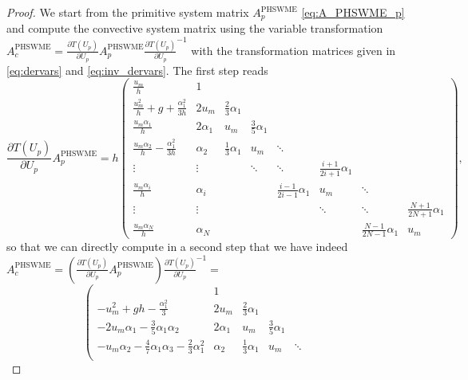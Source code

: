 \documentclass[a4paper, 11pt]{article}
\begin{document}
\begin{proof}
    We start from the primitive system matrix $A^{\textrm{PHSWME}}_{p}$ \eqref{eq:A_PHSWME_p} and compute the convective system matrix using the variable transformation $A^{\textrm{PHSWME}}_{c} = \frac{\partial  T\left(U_{p}\right)}{\partial U_{p}} A^{\textrm{PHSWME}}_{p} \frac{\partial T\left(U_{p}\right)}{\partial U_{p}}^{-1}$ with the transformation matrices given in \eqref{eq:dervars} and \eqref{eq:inv_dervars}. The first step reads
    \begin{equation}
        \frac{\partial  T\left(U_{p}\right)}{\partial U_{p}} A^{\textrm{PHSWME}}_{p} =
        h\left(\begin{array}{cccccccc}
        \frac{u_m}{h} & 1 &  &  &  & &  & \\
        \frac{u_m^2}{h} + g + \frac{\alpha_1^2}{3 h} & 2u_m & \frac{2}{3} \alpha_1 &  &  & &  & \\
        \frac{u_m \alpha_1}{h} & 2\alpha_1 & u_m & \frac{3}{5} \alpha_1 & &&  &\\
        \frac{u_m \alpha_2}{h}-\frac{\alpha_1^2}{3h} & \alpha_2  & \frac{1}{3}\alpha_1 & u_m & \ddots & &  &\\
        \vdots & \vdots &  & \ddots & \ddots & \frac{i+1}{2i+1}\alpha_1 &  &\\
        \frac{u_m \alpha_i}{h} & \alpha_i &  &  & \frac{i-1}{2i-1}\alpha_1 & u_m & \ddots & \\
        \vdots & \vdots &  &  &  & \ddots & \ddots & \frac{N+1}{2N+1}\alpha_1\\
        \frac{u_m \alpha_N}{h} & \alpha_N &  &  & &  &\frac{N-1}{2N-1}\alpha_1 & u_m
        \end{array}\right),
    \end{equation}
    so that we can directly compute in a second step that we have indeed $A^{\textrm{PHSWME}}_{c} = \left( \frac{\partial  T\left(U_{p}\right)}{\partial U_{p}} A^{\textrm{PHSWME}}_{p} \right) \frac{\partial T\left(U_{p}\right)}{\partial U_{p}}^{-1} = $
    \begin{equation}
        \left(\begin{array}{cccccccc}
          & 1 &  &  &  &  &  &  \\
        -u_m^2 + gh - \frac{\alpha_1^2}{3} & 2u_m & \frac{2}{3} \alpha_1 &  &  &  &  &  \\
        -2u_m \alpha_1 - \frac{3}{5}\alpha_1\alpha_2 & 2\alpha_1 & u_m & \frac{3}{5} \alpha_1 & &&  &  \\
        -u_m \alpha_2 - \frac{4}{7}\alpha_1\alpha_3 - \frac{2}{3}\alpha_1^2 & \alpha_2 & \frac{1}{3}\alpha_1 & u_m & \ddots & &  &  \\

\end{array}
\end{equation}
\end{proof}
\end{document}
